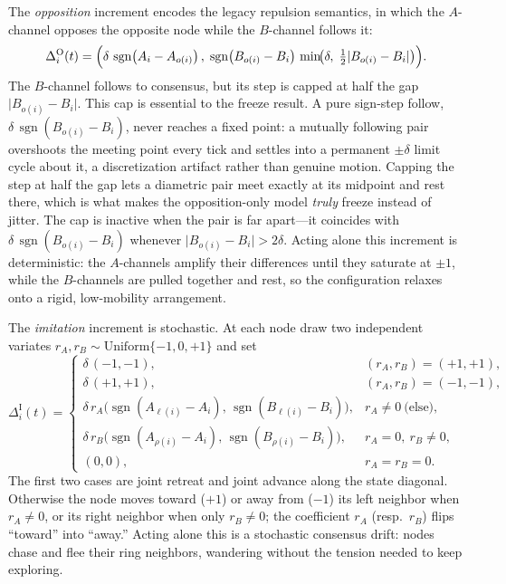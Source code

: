 \documentclass[11pt]{article}
\DeclareMathOperator{\sgn}{sgn}
\begin{document}
The \emph{opposition} increment encodes the legacy repulsion semantics, in which the $A$-channel opposes the
opposite node while the $B$-channel follows it:
\begin{equation}
\Delta^{\mathrm{O}}_i(t)=\Bigl(\delta\,\sgn\!\left(A_i-A_{o(i)}\right),\;
\sgn\!\left(B_{o(i)}-B_i\right)\,\min\!\bigl(\delta,\;\tfrac12\lvert B_{o(i)}-B_i\rvert\bigr)\Bigr).
\label{eq:opp}
\end{equation}
The $B$-channel follows to consensus, but its step is capped at half the gap $\lvert B_{o(i)}-B_i\rvert$. This cap is
essential to the freeze result. A pure sign-step follow, $\delta\,\sgn(B_{o(i)}-B_i)$, never reaches a fixed point:
a mutually following pair overshoots the meeting point every tick and settles into a permanent $\pm\delta$ limit
cycle about it, a discretization artifact rather than genuine motion. Capping the step at half the gap lets a
diametric pair meet exactly at its midpoint and rest there, which is what makes the opposition-only model \emph{truly}
freeze instead of jitter. The cap is inactive when the pair is far apart---it coincides with $\delta\,\sgn(B_{o(i)}-B_i)$
whenever $\lvert B_{o(i)}-B_i\rvert>2\delta$. Acting alone this increment is deterministic: the $A$-channels amplify
their differences until they saturate at $\pm1$, while the $B$-channels are pulled together and rest, so the
configuration relaxes onto a rigid, low-mobility arrangement.

The \emph{imitation} increment is stochastic. At each node draw two independent variates
$r_A,r_B\sim\mathrm{Uniform}\{-1,0,+1\}$ and set
\begin{equation}
\Delta^{\mathrm{I}}_i(t)=
\begin{cases}
\delta\,(-1,-1), & (r_A,r_B)=(+1,+1),\\[2pt]
\delta\,(+1,+1), & (r_A,r_B)=(-1,-1),\\[2pt]
\delta\,r_A\bigl(\sgn(A_{\ell(i)}-A_i),\,\sgn(B_{\ell(i)}-B_i)\bigr), & r_A\neq 0\ \text{(else)},\\[2pt]
\delta\,r_B\bigl(\sgn(A_{\rho(i)}-A_i),\,\sgn(B_{\rho(i)}-B_i)\bigr), & r_A=0,\ r_B\neq 0,\\[2pt]
(0,0), & r_A=r_B=0.
\end{cases}
\label{eq:imit}
\end{equation}
The first two cases are joint retreat and joint advance along the state diagonal. Otherwise the node moves toward
($+1$) or away from ($-1$) its left neighbor when $r_A\neq0$, or its right neighbor when only $r_B\neq0$; the
coefficient $r_A$ (resp.\ $r_B$) flips ``toward'' into ``away.'' Acting alone this is a stochastic consensus drift:
nodes chase and flee their ring neighbors, wandering without the tension needed to keep exploring.
\end{document}
